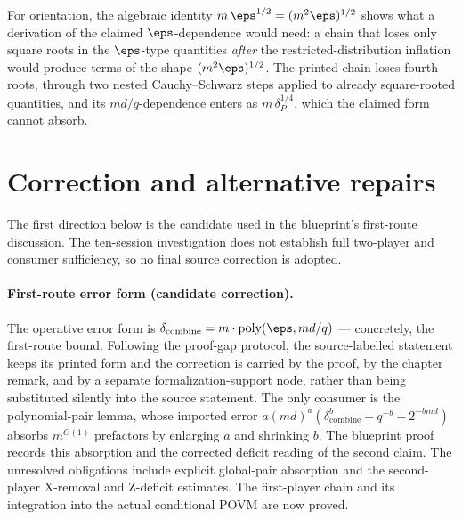 \documentclass[11pt]{article}
\DeclareMathOperator{\poly}{poly}
\begin{document}
For orientation, the algebraic identity
$m\,\eps^{1/2} = (m^2\eps)^{1/2}$ shows what a derivation of the claimed
$\eps$-dependence would need: a chain that loses only square roots in the
$\eps$-type quantities \emph{after} the restricted-distribution
inflation would produce terms of the shape $(m^2\eps)^{1/2}$.  The
printed chain loses fourth roots, through two nested Cauchy--Schwarz
steps applied to already square-rooted quantities, and its
$md/q$-dependence enters as $m\,\delta_P^{1/4}$, which the claimed form
cannot absorb.

\section{Correction and alternative repairs}

The first direction below is the candidate used in the blueprint's first-route
discussion. The ten-session investigation does not establish full two-player
and consumer sufficiency, so no final source correction is adopted.

\paragraph{First-route error form (candidate correction).}
The operative error form is
$\delta_{\mathrm{combine}} = m \cdot \poly(\eps, md/q)$ --- concretely,
the first-route bound.  Following the proof-gap protocol, the source-labelled
statement keeps its printed form and the correction is carried by the proof,
by the chapter remark, and by a separate formalization-support node, rather
than being substituted silently into the source statement.  The only consumer
is the polynomial-pair lemma, whose imported error
$a(md)^a(\delta_{\mathrm{combine}}^b + q^{-b} + 2^{-bmd})$ absorbs
$m^{O(1)}$ prefactors by enlarging $a$ and shrinking $b$.  The blueprint proof
records this absorption and the corrected deficit reading of the second claim.
The unresolved obligations include explicit global-pair absorption and the
second-player X-removal and Z-deficit estimates. The first-player chain and
its integration into the actual conditional POVM are now proved.
\end{document}
